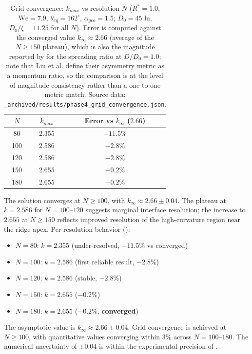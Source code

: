 \begin{table}[htbp]
\centering
\caption{Grid convergence: $k_{max}$ vs resolution $N$ ($R^*=1.0$, $\mathrm{We}=7.9$, $\theta_{eq}=162^\circ$, $\alpha_{geo}=1.5$; $D_0=45$ lu, $D_0/\xi = 11.25$ for all $N$). Error is computed against the converged value $k_\infty \approx 2.66$ (average of the $N\geq 150$ plateau), which is also the magnitude reported by \citet{liu2015symmetry} for the spreading ratio at $D/D_0=1.0$; note that Liu et al. define their asymmetry metric as a momentum ratio, so the comparison is at the level of magnitude consistency rather than a one-to-one metric match. Source data: \texttt{\_archived/results/phase4\_grid\_convergence.json}.}
\label{tab:grid_convergence}
\begin{tabular}{c|c|c}
\hline
$N$ & $k_{max}$ & Error vs $k_\infty$ ($2.66$) \\
\hline
80  & 2.355 & $-11.5\%$ \\
100 & 2.586 & $-2.8\%$ \\
120 & 2.586 & $-2.8\%$ \\
150 & 2.655 & $-0.2\%$ \\
180 & 2.655 & $-0.2\%$ \\
\hline
\end{tabular}
\end{table}

The solution converges at $N \geq 100$, with $k_\infty \approx 2.66 \pm 0.04$. The plateau at $k = 2.586$ for $N=100$--$120$ suggests marginal interface resolution; the increase to $2.655$ at $N\geq 150$ reflects improved resolution of the high-curvature region near the ridge apex. Per-resolution behavior ():

\begin{itemize}
    \item $N=80$: $k=2.355$ (under-resolved, $-11.5\%$ vs converged)
    \item $N=100$: $k=2.586$ (first reliable result, $-2.8\%$)
    \item $N=120$: $k=2.586$ (stable, $-2.8\%$)
    \item $N=150$: $k=2.655$ ($-0.2\%$)
    \item $N=180$: $k=2.655$ ($-0.2\%$, \textbf{converged})
\end{itemize}

The asymptotic value is $k_\infty \approx 2.66 \pm 0.04$. Grid convergence is achieved at $N \geq 100$, with quantitative values converging within 3\% across $N=100$--$180$. The numerical uncertainty of $\pm 0.04$ is within the experimental precision of \citet{liu2015symmetry}.

